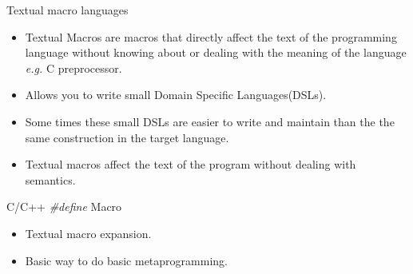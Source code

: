 \begin{frame}{Textual macro languages}
    \begin{itemize}
        \item Textual Macros are macros that directly affect the text of the 
            programming language without knowing about or dealing with the 
            meaning of the language \emph{e.g.} C preprocessor\cite{macrosibm}. 

        \item Allows you to write small Domain Specific Languages(DSLs).

        \item Some times these small DSLs are easier to write and maintain than
            the the same construction in the target language.

        \item Textual macros affect the text of the program without dealing 
            with semantics.
    \end{itemize}
\end{frame}

\begin{frame}{C/C++ \emph{\#define} Macro}
    \begin{itemize}\addtolength{\itemsep}{1\baselineskip}
        \item Textual macro expansion.

        \item Basic way to do basic metaprogramming.
    \end{itemize}
\end{frame}



